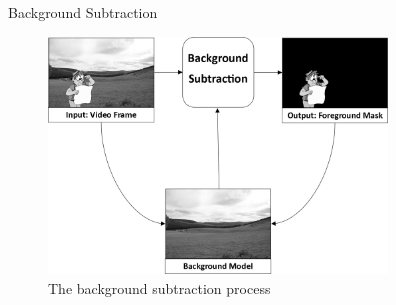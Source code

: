 \documentclass{beamer}
\begin{document}
		\begin{frame}{Background Subtraction}
 \begin{figure}
                    \centering
                   \includegraphics[width = 9cm]{backgroundsubtraction} 
\caption{The background subtraction process}
                  \end{figure}
 \end{frame}
\end{document}
